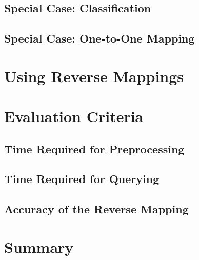 \subsection{Special Case: Classification}

\subsection{Special Case: One-to-One Mapping}

\section{Using Reverse Mappings}





\section{Evaluation Criteria}

\subsection{Time Required for Preprocessing}

\subsection{Time Required for Querying}

\subsection{Accuracy of the Reverse Mapping}


\section{Summary}




